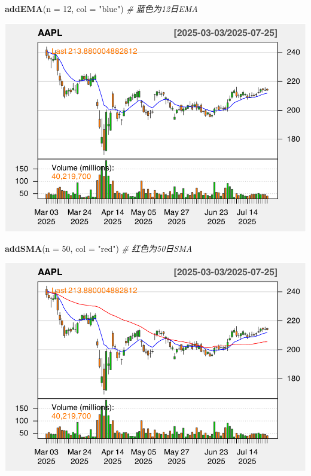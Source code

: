 \documentclass[]{ctexbook}
\newenvironment{Shaded}{\begin{snugshade}}{\end{snugshade}}
\newcommand{\AttributeTok}[1]{\textcolor[rgb]{0.13,0.29,0.53}{#1}}
\newcommand{\CommentTok}[1]{\textcolor[rgb]{0.56,0.35,0.01}{\textit{#1}}}
\newcommand{\DecValTok}[1]{\textcolor[rgb]{0.00,0.00,0.81}{#1}}
\newcommand{\FunctionTok}[1]{\textcolor[rgb]{0.13,0.29,0.53}{\textbf{#1}}}
\newcommand{\NormalTok}[1]{#1}
\newcommand{\StringTok}[1]{\textcolor[rgb]{0.31,0.60,0.02}{#1}}
\begin{document}
\begin{Shaded}
\begin{Highlighting}[]
\FunctionTok{addEMA}\NormalTok{(}\AttributeTok{n =} \DecValTok{12}\NormalTok{, }\AttributeTok{col =} \StringTok{"blue"}\NormalTok{)    }\CommentTok{\# 蓝色为12日EMA}
\end{Highlighting}
\end{Shaded}

\includegraphics[width=0.9\linewidth]{QuantmodHandbook_files/figure-latex/ema-2}

\begin{Shaded}
\begin{Highlighting}[]
\FunctionTok{addSMA}\NormalTok{(}\AttributeTok{n =} \DecValTok{50}\NormalTok{, }\AttributeTok{col =} \StringTok{"red"}\NormalTok{)     }\CommentTok{\# 红色为50日SMA}
\end{Highlighting}
\end{Shaded}

\includegraphics[width=0.9\linewidth]{QuantmodHandbook_files/figure-latex/ema-3}
\end{document}
